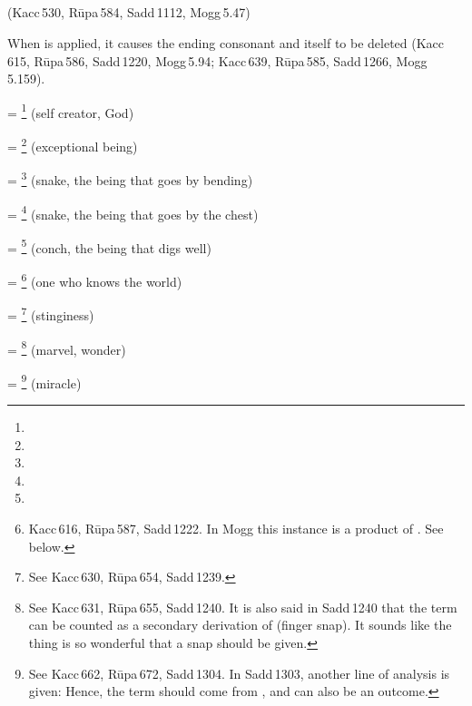 \subparagraph*{} (Kacc\,530, R\=upa\,584, Sadd\,1112, Mogg\,5.47)\label{pacck1:kvi}

When  is applied, it causes the ending consonant and itself to be deleted (Kacc\,615, R\=upa\,586, Sadd\,1220, Mogg\,5.94; Kacc\,639, R\=upa\,585, Sadd\,1266, Mogg\,5.159).

 = \footnote{} (self creator, God)\par
{} = \footnote{} (exceptional being)\par
{} = \footnote{} (snake, the being that goes by bending)\par
{} = \footnote{} (snake, the being that goes by the chest)\par
{} = \footnote{} (conch, the being that digs well)\par
{} = \footnote{Kacc\,616, R\=upa\,587, Sadd\,1222. In Mogg this instance is a product of . See below.} (one who knows the world)\par
{} = \footnote{ See Kacc\,630, R\=upa\,654, Sadd\,1239.} (stinginess)\par
{} = \footnote{ See Kacc\,631, R\=upa\,655, Sadd\,1240. It is also said in Sadd\,1240 that the term can be counted as a secondary derivation of  (finger snap). It sounds like the thing is so wonderful that a snap should be given.} (marvel, wonder)\par
{} = \footnote{ See Kacc\,662, R\=upa\,672, Sadd\,1304. In Sadd\,1303, another line of analysis is given:  Hence, the term should come from , and  can also be an outcome.} (miracle)\par

